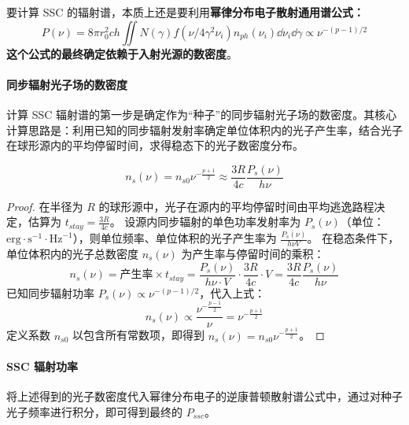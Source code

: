 要计算 SSC 的辐射谱，本质上还是要利用\textbf{幂律分布电子散射通用谱公式：}
\begin{equation}
    P(\nu) = 8\pi r_0^2 ch \iint N(\gamma) f(\nu / 4\gamma^2 \nu_i) n_{ph}(\nu_i) \dd{\nu_i} \dd{\gamma} \propto \nu^{-(p-1)/2}
\end{equation}
\textbf{这个公式的最终确定依赖于入射光源的数密度}。

\paragraph{同步辐射光子场的数密度}
计算 SSC 辐射谱的第一步是确定作为“种子”的同步辐射光子场的数密度。其核心计算思路是：利用已知的同步辐射发射率确定单位体积内的光子产生率，结合光子在球形源内的平均停留时间，求得稳态下的光子数密度分布。

\begin{theorem}[同步辐射场光子数密度]
    \begin{equation}
        \boxed{n_s(\nu) = n_{s0} \nu^{-\frac{p+1}{2}} \approx \frac{3R}{4c} \frac{P_s(\nu)}{h\nu}}
    \end{equation}
\end{theorem}

\begin{proof}
    在半径为 $R$ 的球形源中，光子在源内的平均停留时间由平均逃逸路程决定，估算为 $t_{stay} = \frac{3R}{4c}$。
    设源内同步辐射的单色功率发射率为 $P_s(\nu)$（单位：$\text{erg} \cdot \text{s}^{-1} \cdot \text{Hz}^{-1}$），则单位频率、单位体积的光子产生率为 $\frac{P_s(\nu)}{h\nu V}$。
    在稳态条件下，单位体积内的光子总数密度 $n_s(\nu)$ 为产生率与停留时间的乘积：
    \begin{equation}
        n_s(\nu) = \text{产生率} \times t_{stay} = \frac{P_s(\nu)}{h\nu \cdot V} \cdot \frac{3R}{4c} \cdot V = \frac{3R}{4c} \frac{P_s(\nu)}{h\nu}
    \end{equation}
    已知同步辐射功率 $P_s(\nu) \propto \nu^{-(p-1)/2}$，代入上式：
    \begin{equation}
        n_s(\nu) \propto \frac{\nu^{-\frac{p-1}{2}}}{\nu} = \nu^{-\frac{p+1}{2}}
    \end{equation}
    定义系数 $n_{s0}$ 以包含所有常数项，即得到 $n_s(\nu) = n_{s0} \nu^{-\frac{p+1}{2}}$。
\end{proof}

\paragraph{SSC 辐射功率}
将上述得到的光子数密度代入幂律分布电子的逆康普顿散射谱公式中，通过对种子光子频率进行积分，即可得到最终的 $P_{ssc}$。

